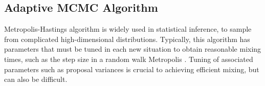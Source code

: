 %
%



\subsection*{Adaptive MCMC Algorithm}


Metropolis-Hastings algorithm is widely used in statistical inference, to sample from complicated high-dimensional distributions. Typically, this algorithm has parameters that must be tuned in each new situation to obtain reasonable mixing times, such as the step size in a random walk Metropolis \cite{mahendran2012adaptive}. Tuning of associated parameters such as proposal variances is crucial to achieving efficient mixing, but can also be difficult. 

